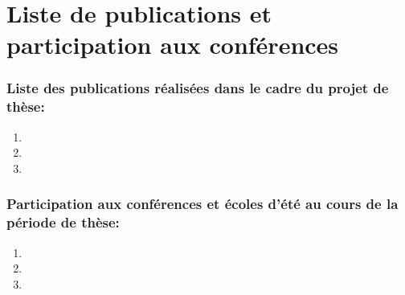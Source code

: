 \newpage
\chapter*{Liste de publications et participation aux conférences}
\subsection*{Liste des publications réalisées dans le cadre du projet de thèse:}
\begin{enumerate}
\item 
\item 
\item 
\end{enumerate}


\subsection*{Participation aux conférences et écoles d’été au cours de la période de thèse:}
\begin{enumerate}
\item 
\item 
\item 
\end{enumerate}